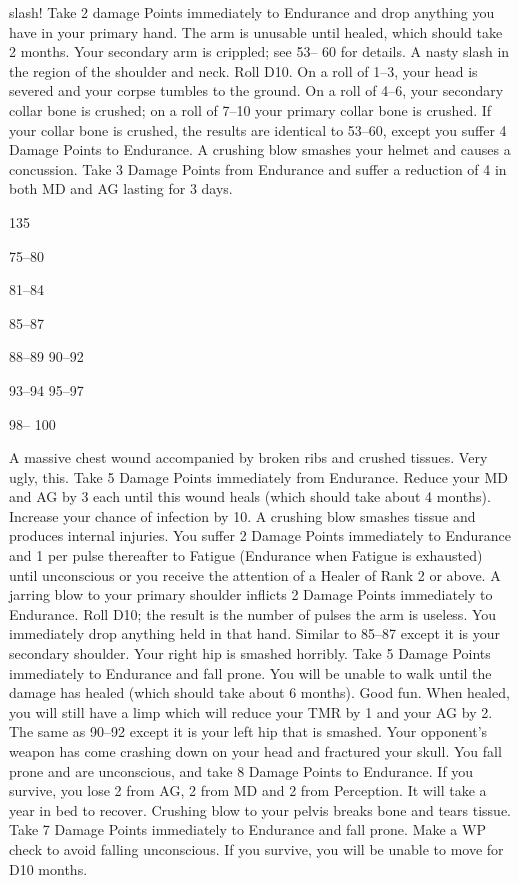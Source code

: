 \documentclass[a4paper]{article}
\begin{document}
\begin{multicols}{3}
slash! Take 2 damage Points immediately
to Endurance and drop anything you have
in your primary hand. The arm is unusable until healed, which should take 2
months.
Your secondary arm is crippled; see 53–
60 for details.
A nasty slash in the region of the shoulder
and neck. Roll D10. On a roll of 1–3, your
head is severed and your corpse tumbles
to the ground. On a roll of 4–6, your
secondary collar bone is crushed; on a roll
of 7–10 your primary collar bone is
crushed. If your collar bone is crushed,
the results are identical to 53–60, except
you suffer 4 Damage Points to Endurance.
A crushing blow smashes your helmet and
causes a concussion. Take 3 Damage
Points from Endurance and suffer a reduction of 4 in both MD and AG lasting for 3
days.

135

75–80

81–84

85–87

88–89
90–92

93–94
95–97

98–
100

A massive chest wound accompanied by
broken ribs and crushed tissues. Very
ugly, this. Take 5 Damage Points immediately from Endurance. Reduce your MD
and AG by 3 each until this wound heals
(which should take about 4 months).
Increase your chance of infection by 10.
A crushing blow smashes tissue and produces internal injuries. You suffer 2
Damage Points immediately to Endurance
and 1 per pulse thereafter to Fatigue (Endurance when Fatigue is exhausted) until
unconscious or you receive the attention
of a Healer of Rank 2 or above.
A jarring blow to your primary shoulder
inflicts 2 Damage Points immediately to
Endurance. Roll D10; the result is the
number of pulses the arm is useless. You
immediately drop anything held in that
hand.
Similar to 85–87 except it is your secondary shoulder.
Your right hip is smashed horribly. Take
5 Damage Points immediately to Endurance and fall prone. You will be unable to
walk until the damage has healed (which
should take about 6 months). Good fun.
When healed, you will still have a limp
which will reduce your TMR by 1 and
your AG by 2.
The same as 90–92 except it is your left
hip that is smashed.
Your opponent’s weapon has come crashing down on your head and fractured your
skull. You fall prone and are unconscious,
and take 8 Damage Points to Endurance.
If you survive, you lose 2 from AG, 2
from MD and 2 from Perception. It will
take a year in bed to recover.
Crushing blow to your pelvis breaks bone
and tears tissue. Take 7 Damage Points
immediately to Endurance and fall prone.
Make a WP check to avoid falling unconscious. If you survive, you will be unable
to move for D10 months.


\end{multicols}
\end{document}
